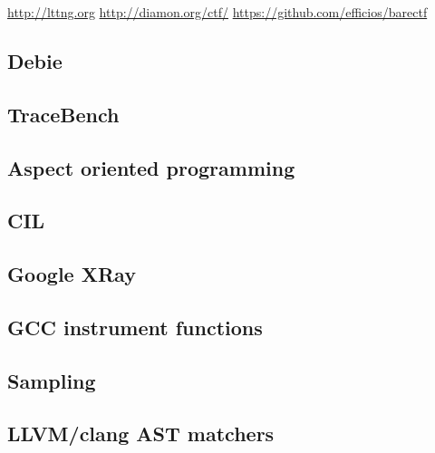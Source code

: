 \url{http://lttng.org}
\url{http://diamon.org/ctf/}
\url{https://github.com/efficios/barectf}
\subsection{Debie}
\subsection{TraceBench}
\subsection{Aspect oriented programming}
\subsection{CIL}
\subsection{Google XRay}
\subsection{GCC instrument functions}
\subsection{Sampling}
\subsection{LLVM/clang AST matchers}
